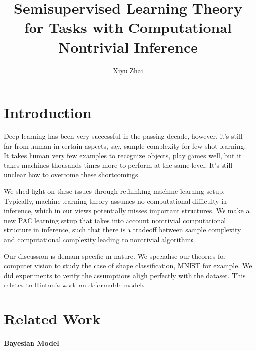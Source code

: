 \documentclass[11pt, oneside]{article}   	%
\title{Semisupervised Learning Theory for Tasks with Computational Nontrivial Inference}
\author{Xiyu Zhai}
\date{}							%
\theoremstyle{definition}
\begin{document}
\maketitle
\tableofcontents
{}

\section{Introduction}

Deep learning has been very successful in the passing decade, however, it's still far from human in certain aspects, say, sample complexity for few shot learning. It takes human very few examples to recognize objects, play games well, but it takes machines thousands times more to perform at the same level. It's still unclear how to overcome these shortcomings.

We shed light on these issues through rethinking machine learning setup. Typically, machine learning theory assumes no computational difficulty in inference, which in our views potentially misses important structures. We make a new PAC learning setup that takes into account nontrivial computational structure in inference, such that there is a tradeoff between sample complexity and computational complexity leading to nontrivial algorithms. 

Our discussion is domain specific in nature. We specialise our theories for computer vision to study the case of shape classification, MNIST for example. We did experiments to verify the assumptions aligh perfectly with the dataset. This relates to Hinton's work on deformable models.

\section{Related Work}

\paragraph{Bayesian Model}
\end{document}
